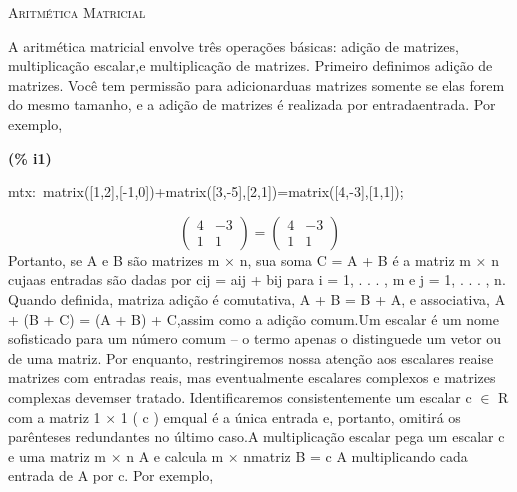 \documentclass[fleqn]{article}
\begin{document}
\pagebreak{}
{\Huge {\scshape Aritmética Matricial}}
\setcounter{section}{0}
\setcounter{subsection}{0}
\setcounter{figure}{0}

A aritmética matricial envolve três operações básicas: adição de matrizes, multiplicação escalar,e multiplicação de matrizes. Primeiro definimos adição de matrizes. Você tem permissão para adicionarduas matrizes somente se elas forem do mesmo tamanho, e a adição de matrizes é realizada por entradaentrada. Por exemplo,


\noindent
\begin{minipage}[t]{4.000000em}\color{red}\bfseries
(\% i1)	
\end{minipage}
\begin{minipage}[t]{\textwidth}\color{blue}
mtx:\ matrix([1,2],[-1,0])+matrix([3,-5],[2,1])=matrix([4,-3],[1,1]);
\end{minipage}
\[\displaystyle \tag{mtx} 
\begin{pmatrix}4 & \mathop{-}3\\
1 & 1\end{pmatrix}\mathop{=}\begin{pmatrix}4 & \mathop{-}3\\
1 & 1\end{pmatrix}\mbox{}
\]
Portanto, se A e B são matrizes m × n, sua soma C = A + B é a matriz m × n cujaas entradas são dadas por cij = aij + bij para i = 1, . . . , m e j = 1, . . . , n. Quando definida, matriza adição é comutativa, A + B = B + A, e associativa, A + (B + C) = (A + B) + C,assim como a adição comum.Um escalar é um nome sofisticado para um número comum – o termo apenas o distinguede um vetor ou de uma matriz. Por enquanto, restringiremos nossa atenção aos escalares reaise matrizes com entradas reais, mas eventualmente escalares complexos e matrizes complexas devemser tratado. Identificaremos consistentemente um escalar c \ensuremath{\in} R com a matriz 1 × 1 ( c ) emqual é a única entrada e, portanto, omitirá os parênteses redundantes no último caso.A multiplicação escalar pega um escalar c e uma matriz m × n A e calcula m × nmatriz B = c A multiplicando cada entrada de A por c. Por exemplo,
\end{document}

